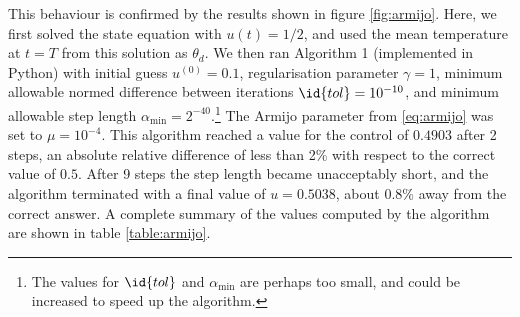 This behaviour is confirmed by the results shown in figure \ref{fig:armijo}. Here, we first solved the state equation with $u(t) = 1/2$, and used the mean temperature at $t=T$ from this solution as $\theta_d$. We then ran Algorithm 1 (implemented in Python) with initial guess $u^{(0)} = 0.1$, regularisation parameter $\gamma = 1$, minimum allowable normed difference between iterations $\id{tol} = 10^{-10}$, and minimum allowable step length $\alpha_{\min} = 2^{-40}$.\footnote{The values for $\id{tol}$ and $\alpha_{\min}$ are perhaps too small, and could be increased to speed up the algorithm.} The Armijo parameter from \eqref{eq:armijo} was set to $\mu=10^{-4}$. This algorithm reached a value for the control of $0.4903$ after 2 steps, an absolute relative difference of less than 2\% with respect to the correct value of $0.5$. After 9 steps the step length became unacceptably short, and the algorithm terminated with a final value of $u=0.5038$, about 0.8\% away from the correct answer. A complete summary of the values computed by the algorithm are shown in table \ref{table:armijo}. 
